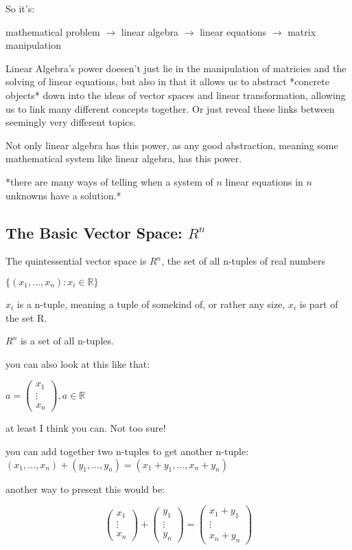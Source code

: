 \documentclass{article}
\begin{document}
So it's:

mathematical problem  $\rightarrow$ linear algebra $\rightarrow$ linear equations $\rightarrow$ matrix manipulation


Linear Algebra's power doesen't just lie in the manipulation of matricies and the solving
of linear equations, but also in that it allows us to abstract *concrete objects* down into the
ideas of vector spaces and linear transformation, allowing us to link many different concepts
together. Or just reveal these links between seemingly very different topics.

Not only linear algebra has this power, as any good abstraction, meaning some mathematical
system like linear algebra, has this power.

*there are many ways of telling when a system of $n$ linear equations in $n$ unknowns have a solution.*


\subsection{ The Basic Vector Space: $R^n$}

The quintessential vector space is $R^n$, the set of all n-tuples of real numbers

$\{ \left( x_{1},\ldots ,x_{n}\right):x_i\in\mathbb{R}\}$

$x_i$ is a n-tuple, meaning a tuple of somekind of, or rather any size, $x_i$ is part of the set R.

$R^n$ is a set of all n-tuples.

you can also look at this like that:


$a=\begin{pmatrix} x_1 \\ \vdots \\x_n \end{pmatrix}, a \in \mathbb{R}$

at least I think you can. Not too sure!


you can  add together two n-tuples to get another n-tuple:
$(x_1,\ldots, x_n)+(y_1,\ldots, y_n)=(x_1+y_1,\ldots, x_n+y_n)$

another way to present this would be:

$$\begin{pmatrix} x_1 \\ \vdots \\ x_n \end{pmatrix} + \begin{pmatrix} y_1 \\ \vdots \\ y_n \end{pmatrix} = \begin{pmatrix} x_1+y_1 \\ \vdots \\ x_n+y_n \end{pmatrix}$$
\end{document}
